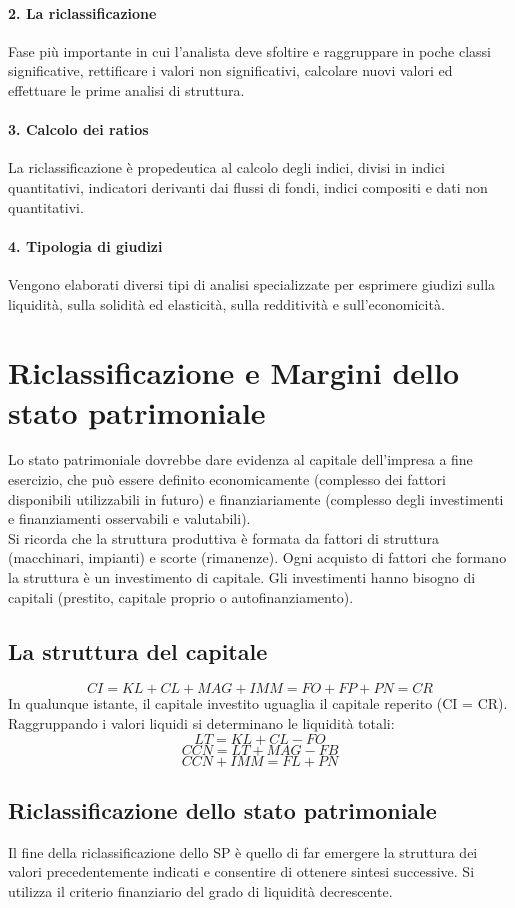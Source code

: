\documentclass{report}
\begin{document}
	\paragraph{2. La riclassificazione} Fase più importante in cui l'analista deve sfoltire e raggruppare in poche classi significative, rettificare i valori non significativi, calcolare nuovi valori ed effettuare le prime analisi di struttura.
	\paragraph{3. Calcolo dei ratios} La riclassificazione è propedeutica al calcolo degli indici, divisi in indici quantitativi, indicatori derivanti dai flussi di fondi, indici compositi e dati non quantitativi.
	\paragraph{4. Tipologia di giudizi} Vengono elaborati diversi tipi di analisi specializzate per esprimere giudizi sulla liquidità, sulla solidità ed elasticità, sulla redditività e sull'economicità.
	
	\section{Riclassificazione e Margini dello stato patrimoniale}
	Lo stato patrimoniale dovrebbe dare evidenza al capitale dell'impresa a fine esercizio, che può essere definito economicamente (complesso dei fattori disponibili utilizzabili in futuro) e finanziariamente (complesso degli investimenti e finanziamenti osservabili e valutabili).
	\medskip \\Si ricorda che la struttura produttiva è formata da fattori di struttura (macchinari, impianti) e scorte (rimanenze). Ogni acquisto di fattori che formano la struttura è un investimento di capitale. Gli investimenti hanno bisogno di capitali (prestito, capitale proprio o autofinanziamento).
	\subsection{La struttura del capitale}
	\[CI = KL + CL + MAG + IMM = FO + FP + PN = CR\]
	In qualunque istante, il capitale investito uguaglia il capitale reperito (CI = CR).
	\medskip \\
	Raggruppando i valori liquidi si determinano le liquidità totali:
	\[ LT = KL + CL - FO\]
	\[CCN = LT + MAG - FB\]
	\[CCN + IMM = FL + PN\]
	\subsection{Riclassificazione dello stato patrimoniale}
	Il fine della riclassificazione dello SP è quello di far emergere la struttura dei valori precedentemente indicati e consentire di ottenere sintesi successive. Si utilizza il criterio finanziario del grado di liquidità decrescente.
\end{document}
